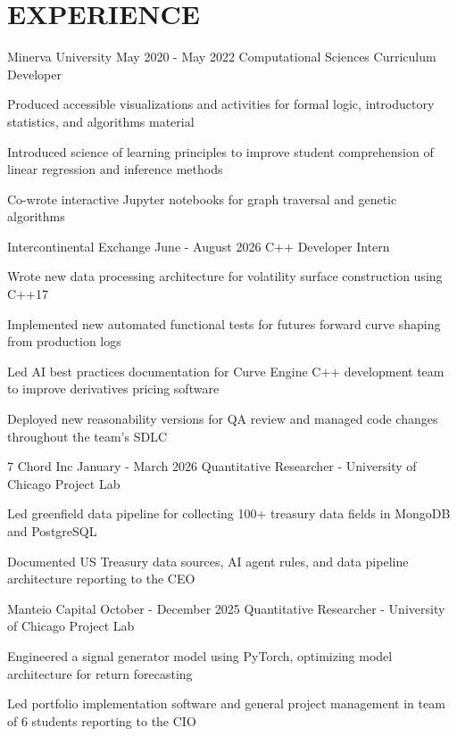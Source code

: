 \section{EXPERIENCE}


\begin{experience}
                   {Minerva University}
                   {May 2020 - May 2022}
                   {Computational Sciences Curriculum Developer}
    \item Produced accessible visualizations and activities for formal logic, introductory statistics, and algorithms material
    \item Introduced science of learning principles to improve student comprehension of linear regression and inference methods
    \item Co-wrote interactive Jupyter notebooks for graph traversal and genetic algorithms
\end{experience}

\begin{experience}[Atlanta, GA]
    {Intercontinental Exchange}
    {June - August 2026}
    {C++ Developer Intern}
    \item Wrote new data processing architecture for volatility surface construction using C++17
    \item Implemented new automated functional tests for futures forward curve shaping from production logs
    \item Led AI best practices documentation for Curve Engine C++ development team to improve derivatives pricing software
    \item Deployed new reasonability versions for QA review and managed code changes throughout the team's SDLC
\end{experience}

\begin{experience}[Chicago, IL]
            {7 Chord Inc}
            {January - March 2026}
            {Quantitative Researcher - University of Chicago Project Lab}
    \item Led greenfield data pipeline for collecting 100+ treasury data fields in MongoDB and PostgreSQL
    \item Documented US Treasury data sources, AI agent rules, and data pipeline architecture reporting to the CEO
\end{experience}
\begin{experience}[Chicago, IL]
            {Manteio Capital}
            {October - December 2025}
            {Quantitative Researcher - University of Chicago Project Lab}
    \item Engineered a signal generator model using PyTorch, optimizing model architecture for return forecasting
    \item Led portfolio implementation software and general project management in team of 6 students reporting to the CIO
\end{experience}


